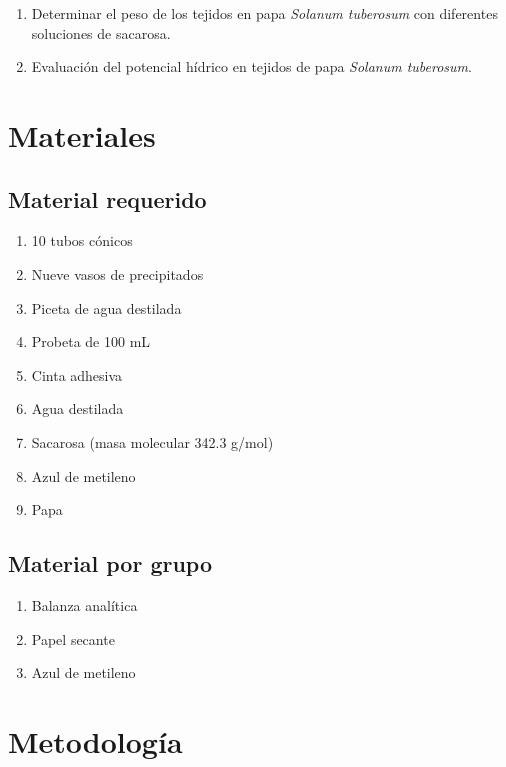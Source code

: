\begin{enumerate}
	
	\item Determinar el peso de los tejidos en papa \textit{Solanum tuberosum} con diferentes soluciones de sacarosa. 
	
	\item Evaluaci\'on del potencial h\'idrico en tejidos de papa \textit{Solanum tuberosum}.
	
\end{enumerate}

\section{Materiales}

\subsection{Material requerido}

\begin{enumerate}
	\item 10 tubos c\'onicos
	\item Nueve vasos de precipitados 
	\item Piceta de agua destilada
	\item Probeta de 100 mL
	\item Cinta adhesiva
	\item Agua destilada
	\item Sacarosa (masa molecular 342.3 g/mol)
	\item Azul de metileno
	\item Papa
\end{enumerate}

\subsection{Material por grupo}

\begin{enumerate}
	\item Balanza anal\'itica
	\item Papel secante
	\item Azul de metileno
\end{enumerate}

\section{Metodolog\'ia}

